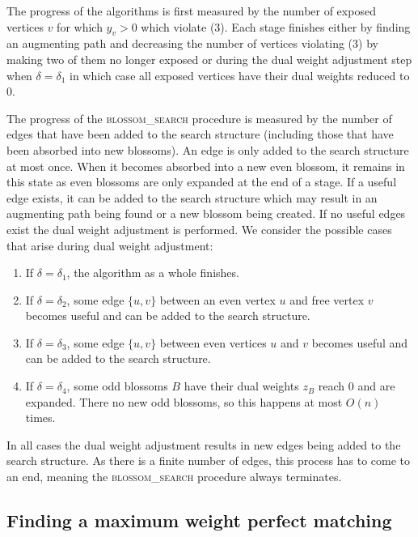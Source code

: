 The progress of the algorithms is first measured by the number of exposed vertices $v$ for which $y_v > 0$ which violate (3). Each stage finishes either by finding an augmenting path and decreasing the number of vertices violating (3) by making two of them no longer exposed or during the dual weight adjustment step when $\delta = \delta_1$ in which case all exposed vertices have their dual weights reduced to $0$.

The progress of the \textsc{blossom\_search} procedure is measured by the number of edges that have been added to the search structure (including those that have been absorbed into new blossoms). An edge is only added to the search structure at most once. When it becomes absorbed into a new even blossom, it remains in this state as even blossoms are only expanded at the end of a stage. If a useful edge exists, it can be added to the search structure which may result in an augmenting path being found or a new blossom being created. If no useful edges exist the dual weight adjustment is performed. We consider the possible cases that arise during dual weight adjustment:

\begin{enumerate}
    \item If $\delta = \delta_1$, the algorithm as a whole finishes.
    \item If $\delta = \delta_2$, some edge $\{u, v\}$ between an even vertex $u$ and free vertex $v$ becomes useful and can be added to the search structure.
    \item If $\delta = \delta_3$, some edge $\{u, v\}$ between even vertices $u$ and $v$ becomes useful and can be added to the search structure.
    \item If $\delta = \delta_4$, some odd blossoms $B$ have their dual weights $z_B$ reach $0$ and are expanded. There no new odd blossoms, so this happens at most $O(n)$ times.
\end{enumerate}

In all cases the dual weight adjustment results in new edges being added to the search structure. As there is a finite number of edges, this process has to come to an end, meaning the \textsc{blossom\_search} procedure always terminates.

\subsection{Finding a maximum weight perfect matching}

